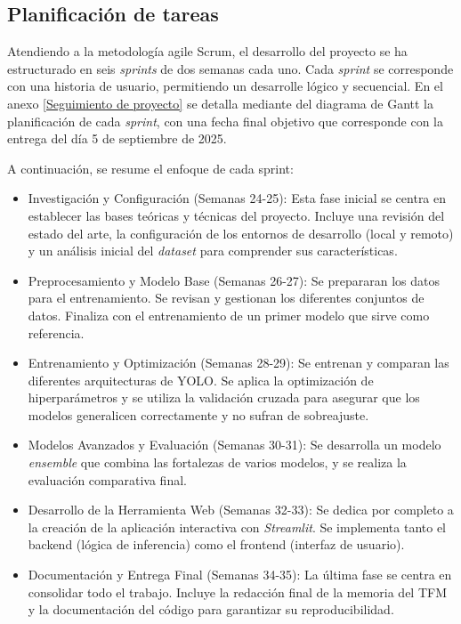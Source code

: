 \documentclass[12pt,a4paper,onecolumn,oneside]{report}
\begin{document}
\subsection{Planificación de tareas}
\label{Planificación de tareas}

Atendiendo a la metodología agile Scrum, el desarrollo del proyecto se ha estructurado en seis \textit{sprints} de dos semanas cada uno.
Cada \textit{sprint} se corresponde con una historia de usuario, permitiendo un desarrolle lógico y secuencial.
En el anexo \autoref{Seguimiento de proyecto} se detalla mediante del diagrama de Gantt \cite{OnlineGantt2025} la planificación de cada \textit{sprint}, con una fecha final objetivo que corresponde con la entrega del día 5 de septiembre de 2025.

A continuación, se resume el enfoque de cada sprint:

\begin{itemize}[label=-]
  \item Investigación y Configuración (Semanas 24-25): Esta fase inicial se centra en establecer las bases teóricas y técnicas del proyecto. Incluye una revisión del estado del arte, la configuración de los entornos de desarrollo (local y remoto) y un análisis inicial del \textit{dataset} para comprender sus características.
  
  \item Preprocesamiento y Modelo Base (Semanas 26-27): Se prepararan los datos para el entrenamiento. Se revisan y gestionan los diferentes conjuntos de datos. Finaliza con el entrenamiento de un primer modelo que sirve como referencia.
  
  \item Entrenamiento y Optimización (Semanas 28-29): Se entrenan y comparan las diferentes arquitecturas de YOLO. Se aplica la optimización de hiperparámetros y se utiliza la validación cruzada para asegurar que los modelos generalicen correctamente y no sufran de sobreajuste.
  
  \item Modelos Avanzados y Evaluación (Semanas 30-31): Se desarrolla un modelo \textit{ensemble} que combina las fortalezas de varios modelos, y se realiza la evaluación comparativa final.
  
  \item Desarrollo de la Herramienta Web (Semanas 32-33): Se dedica por completo a la creación de la aplicación interactiva con \textit{Streamlit}. Se implementa tanto el backend (lógica de inferencia) como el frontend (interfaz de usuario).
  
  \item Documentación y Entrega Final (Semanas 34-35): La última fase se centra en consolidar todo el trabajo. Incluye la redacción final de la memoria del TFM y la documentación del código para garantizar su reproducibilidad.
\end{itemize}
\end{document}
